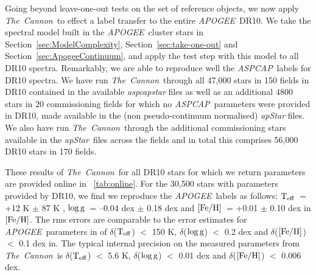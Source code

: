 \documentclass[12pt, preprint]{aastex}
\newcommand{\sectionname}{Section}
\newcommand{\tc}{\textsl{The~Cannon}}
\newcommand{\apogee}{\textsl{APOGEE}}
\newcommand{\aspcap}{\textsl{ASPCAP}}
\newcommand{\apstar}{\textsl{apStar}}
\newcommand{\teff}{\mbox{$\rm T_{eff}$}}
\newcommand{\feh}{\mbox{$\rm [Fe/H]$}}
\newcommand{\logg}{\mbox{$\rm \log g$}}
\begin{document}
Going beyond leave-one-out tests on the set of reference objects, we now apply \tc\ to effect a label transfer to the entire \apogee\ DR10.
We take the spectral model built in the \apogee\ cluster stars in \sectionname~\ref{sec:ModelComplexity}, \sectionname~\ref{sec:take-one-out} and \sectionname~\ref{sec:ApogeeContinuum},
and apply the test step with this model to all DR10 spectra.
Remarkably, we are able to reproduce well the \aspcap\ labels for DR10 spectra. We have run \tc\ through all 47,000 stars in 150 fields in DR10 contained in the available \textit{aspcapstar} files as well as an additional 4800 stars in 20 commissioning fields for which no \aspcap\ parameters were provided in DR10, 
made available in the (non pseudo-continuum normalised) \textit{apStar} files. 
We also have run \tc\ through the additional commissioning stars available in the \apstar\ files across the fields and in total this
 comprises 56,000 DR10 stars in 170 fields. 

These results of \tc\ for all DR10 stars for which we return parameters are provided online in \tablename~\ref{tab:online}. 
For the 30,500 stars with parameters provided by DR10, we find we reproduce the \apogee\ labels as follows: 
\teff\ = +12 K $\pm$ 87 K , \logg\ = --0.04 dex $\pm$ 0.18 dex and \feh\ = +0.01 $\pm$ 0.10 dex in \feh. 
The rms errors are comparable to the error estimates for \apogee\ parameters in \citet{Meszaros2013} 
of $\delta$(\teff) $<$ 150 K, $\delta$(\logg) $<$ 0.2 dex and $\delta$(\feh) $<$ 0.1 dex in. 
The typical internal precision on the measured parameters from \tc\ is $\delta$(\teff) $<$ 5.6 K, $\delta$(\logg) $<$ 0.01 dex and $\delta$(\feh) $<$ 0.006 dex.
\end{document}
